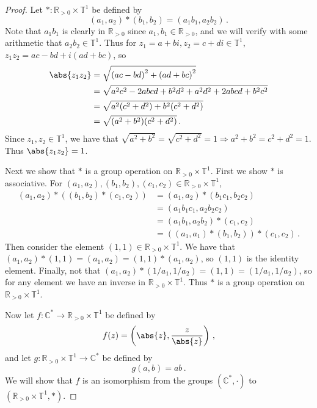 \documentclass{abrice}
\newcommand{\R}{\mathbb{R}}
\renewcommand{\C}{\mathbb{C}}
\newcommand{\T}{\mathbb{T}}
\begin{document}
\begin{proof}
  Let $* : \R_{>0} \times \T^1$ be defined by
  \[
    (a_1, a_2) * (b_1, b_2) = ( a_1b_1, a_2 b_2)\,
    .
  \]
  Note that $a_1 b_1$ is clearly in $\R_{>0}$ since $a_1, b_1 \in \R_{>0}$, and
  we will verify with some arithmetic that $a_2 b_2 \in \T^1$. Thus for $z_1 =
  a+bi, z_2 = c + di \in \T^1$, $z_1 z_2 = ac - bd + i(ad +bc)$, so
  \begin{align*}
    \abs{z_1 z_2}
    &= \sqrt{{(ac-bd)}^2 + {(ad+bc)}^2} \\
    &= \sqrt{a^2c^2 - 2abcd + b^2d^2 + a^2d^2 + 2abcd + b^2c^2} \\
    &= \sqrt{a^2(c^2 + d^2) + b^2(c^2 + d^2)} \\
    &= \sqrt{(a^2 + b^2)(c^2 + d^2)}\, .
  \end{align*}
  Since $z_1, z_2 \in \T^1$, we have that $\sqrt{a^2 + b^2} = \sqrt{c^2 + d^2} =
  1 \Rightarrow a^2 + b^2 = c^2 + d^2 = 1$. Thus $\abs{z_1 z_2} = 1$.

  Next we show that $*$ is a group operation on $\R_{>0} \times \T^1$. First we
  show $*$ is associative. For $(a_1, a_2), (b_1, b_2), (c_1, c_2) \in \R_{>0}
  \times \T^1$,
  \begin{align*}
    (a_1, a_2) * ((b_1, b_2) * (c_1, c_2))
    &= (a_1, a_2) * (b_1 c_1, b_2 c_2) \\
    &= (a_1 b_1 c_1, a_2 b_2 c_2) \\
    &= (a_1 b_1, a_2 b_2) * (c_1, c_2) \\
    &= ((a_1, a_1) * (b_1, b_2)) * (c_1, c_2)\, .
  \end{align*}
  Then consider the element $(1,1) \in \R_{>0} \times \T^1$. We have that $(a_1,
  a_2) * (1,1) = (a_1, a_2) = (1,1) * (a_1, a_2)$, so $(1,1)$ is the identity
  element. Finally, not that $(a_1, a_2) * (1/a_1, 1/a_2) = (1,1) = (1/a_1,
  1/a_2)$, so for any element we have an inverse in $\R_{>0} \times \T^1$. Thus
  $*$ is a group operation on $\R_{>0} \times \T^1$.

  Now let $f : \C^* \to \R_{>0} \times \T^1$ be defined by
  \[
    f(z) = \left(\abs{z}, {z \over \abs{z}}\right)\, ,
  \]
  and let $g : \R_{>0} \times \T^1 \to \C^*$ be defined by
  \[
    g(a, b) = ab\, .
  \]
  We will show that $f$ is an isomorphism from the groups $(\C^*, \cdot)$ to
  $(\R_{>0} \times \T^1, *)$.


\end{proof}
\end{document}
